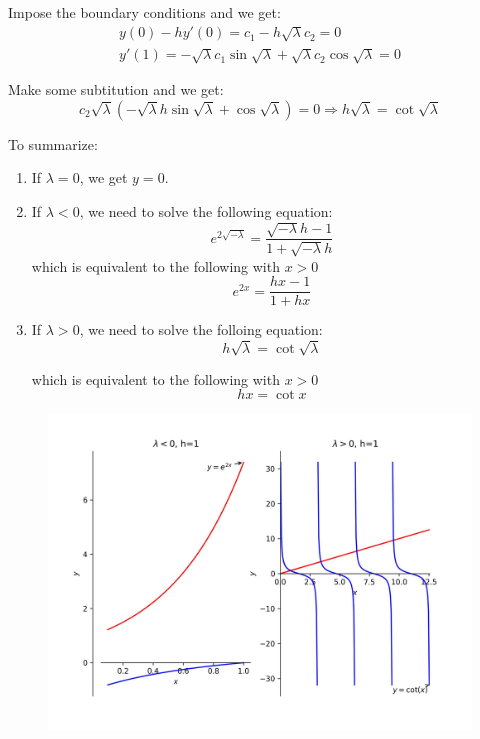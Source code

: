 \documentclass[11pt]{article}
\begin{document}
Impose the boundary conditions and we get:
\begin{gather*}
y(0)-hy'(0)=c_1-h\sqrt{\lambda}c_2=0 \\
y'(1) = -\sqrt{\lambda}c_1\sin{\sqrt{\lambda}} + \sqrt{\lambda}c_2\cos{\sqrt{\lambda}}=0
\end{gather*}

Make some subtitution and we get:\[
c_2\sqrt{\lambda}(-\sqrt{\lambda}h\sin \sqrt{\lambda} + \cos \sqrt{\lambda})=0 \Longrightarrow h\sqrt{\lambda} = \cot \sqrt{\lambda}\]

To summarize:
\begin{enumerate}
\item If $\lambda=0$, we get $y=0$.

\item If $\lambda < 0$, we need to solve the following equation:
\begin{equation}
e^{2\sqrt{-\lambda}}=\frac{\sqrt{-\lambda}h - 1}{1+\sqrt{-\lambda}h}
\end{equation}
which is equivalent to the following with $x>0$
\begin{equation}
e^{2x} = \frac{hx-1}{1+hx}
\end{equation}

\item If $\lambda > 0$, we need to solve the folloing equation:
\begin{equation}
h\sqrt{\lambda}=\cot \sqrt{\lambda}
\end{equation}

which is equivalent to the following with $x>0$ 
\begin{equation}
hx = \cot x
\end{equation}

\end{enumerate}

\begin{figure}
\centerline{\includegraphics{h_1.jpg}}
\end{figure}
\end{document}
